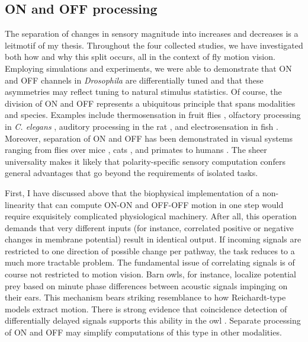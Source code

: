 \subsection{ON and OFF processing}
The separation of changes in sensory magnitude into increases and decreases is a leitmotif of my thesis. Throughout the four collected studies, we have investigated both how and why this split occurs, all in the context of fly motion vision. Employing simulations and experiments, we were able to demonstrate that ON and OFF channels in \textit{Drosophila} are differentially tuned and that these asymmetries may reflect tuning to natural stimulus statistics. Of course, the division of ON and OFF represents a ubiquitous principle that spans modalities and species. Examples include thermosensation in fruit flies \citep{Gallio:2011aa}, olfactory processing in \textit{C. elegans} \citep{Chalasani:2007aa}, auditory processing in the rat \citep{Scholl:2010aa}, and electrosensation in fish \citep{Clarke:2015aa}. Moreover, separation of ON and OFF has been demonstrated in visual systems ranging from flies \citep{Joesch:2010fw} over mice \citep{Euler:2014aa}, cats \citep{Wassle:2004aa}, and primates \citep{Field:2007aa} to humans \citep{Hashimoto:2013aa}. The sheer universality makes it likely that polarity-specific sensory computation confers general advantages that go beyond the requirements of isolated tasks.

First, I have discussed above that the biophysical implementation of a non-linearity that can compute ON-ON and OFF-OFF motion in one step would require exquisitely complicated physiological machinery. After all, this operation demands that very different inputs (for instance, correlated positive or negative changes in membrane potential) result in identical output. If incoming signals are restricted to one direction of possible change per pathway, the task reduces to a much more tractable problem. The fundamental issue of correlating signals is of course not restricted to motion vision. Barn owls, for instance, localize potential prey based on minute phase differences between acoustic signals impinging on their ears. This mechanism bears striking resemblance to how Reichardt-type models extract motion. There is strong evidence that coincidence detection of differentially delayed signals supports this ability in the owl \citep{Jeffress:1948aa,Carr:1988aa}. Separate processing of ON and OFF may simplify computations of this type in other modalities.

